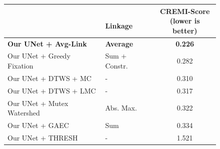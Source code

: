 \begin{figure}[t]
        \centering
\begin{minipage}[t]{0.56\textwidth}
    \centering
    \scriptsize
        \begin{tabular}[t]{l|l|c}
         & \makecell[l]{\algname{}\\ Linkage} & \makecell{CREMI-Score \\(lower is better)} \\ \midrule 
\textbf{Our UNet + \algname{} Avg-Link} & \textbf{Average}& \textbf{0.226}  \\
Our UNet + Greedy Fixation \cite{levinkov2017comparative} & Sum + Constr. & 0.282 \\
Our UNet + DTWS + MC & -& 0.310 \\
Our UNet + DTWS + LMC & -& 0.317 \\
Our UNet + Mutex Watershed \cite{wolf2018mutex} & Abs. Max.  & 0.322 \\
Our UNet + GAEC \cite{keuper2015efficient} & Sum & 0.334 \\
Our UNet + THRESH &-& 1.521 \\ 

\end{tabular}
\end{minipage}
\end{figure}
